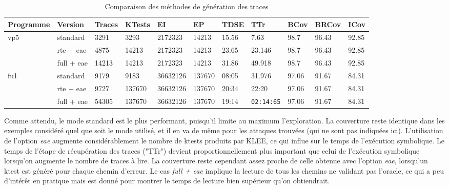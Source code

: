             \begin{table}[h]
                \footnotesize
                \caption{Comparaison des méthodes de génération des traces}
                \label{tbl:metrics-traces-eae}
                \setlength\tabcolsep{3.5pt}
                \begin{center}
                    \begin{tabular}{l|l|l|l|l|l|l|l|l|l|l}
                    Programme & Version & Traces & KTests & EI & EP & TDSE & TTr & BCov & BRCov & ICov \\
                    \hline
                    vp5 & standard & 3291 & 3293 & 2172323 & 14213 & 15.56 & 7.63 & 98.7 & 96.43 & 92.85 \\
                     & rte + eae & 4875 & 14213 & 2172323 & 14213 & 23.65 & 23.146 & 98.7 & 96.43 & 92.85 \\
                     & full + eae & 14213 & 14213 & 2172323 & 14213 & 31.86 & 49.918 & 98.7 & 96.43 & 92.85 \\
                    fu1 & standard & 9179 & 9183 & 36632126 & 137670 & 08:05 & 31.976 & 97.06 & 91.67 & 84.31 \\
                     & rte + eae & 9727 & 137670 & 36632126 & 137670 & 20:34 & 22:20 & 97.06 & 91.67 & 84.31 \\
                     & full + eae & 54305 & 137670 & 36632126 & 137670 & 19:14 & \texttt{02:14:65} & 97.06 & 91.67 & 84.31
                    \end{tabular}
                \end{center}
            \end{table}  
            
            Comme attendu, le mode standard est le plus performant, puisqu'il limite au maximum l'exploration.
            La couverture reste identique dans les exemples considéré quel que soit le mode utilisé, et il en va de même pour les attaques trouvées (qui ne sont pas indiquées ici). 
            L'utilisation de l'option \textit{eae} augmente considérablement le nombre de ktests produits par KLEE, ce qui influe sur le temps de l'exécution symbolique.
            Le temps de l'étape de récupération des traces ("TTr") devient proportionnellement plus important que celui de l'exécution symbolique lorsqu'on augmente le nombre de traces à lire.                
            La couverture reste cependant assez proche de celle obtenue avec l'option \textit{eae}, lorsqu'un ktest est généré pour chaque chemin d'erreur. 
            Le cas \textit{full + eae} implique la lecture de tous les chemins ne validant pas l'oracle, ce qui a peu d'intérêt en pratique mais est donné pour montrer le temps de lecture bien supérieur qu'on obtiendrait. 
        
